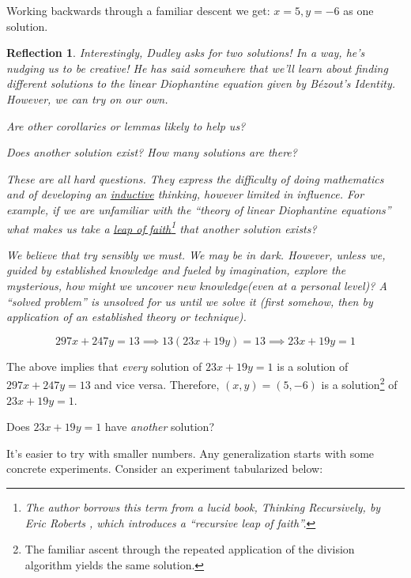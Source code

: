 \documentclass[english,notitlepage,smartquotes]{hgbreport}
\theoremstyle{definition}
\theoremstyle{remark}
\theoremstyle{plain}
\newtheorem{reflection}{Reflection}
\begin{document}
\begin{enumerate}[label=\textbf{\arabic*}.]
Working backwards through a familiar descent we get: $x=5,y=-6$ as one solution.
\begin{reflection}
Interestingly, Dudley asks for two solutions! In a way, he's nudging us to be creative! He has said somewhere that we'll learn about finding different solutions to the linear Diophantine equation given by B\'ezout's Identity. However, we can try on our own.

Are other corollaries or lemmas likely to help us?

Does another solution exist? How many solutions are there?

These are all hard questions. They express the difficulty of doing mathematics and of developing an \underline{inductive} thinking, however limited in influence. For example, if we are unfamiliar with the ``theory of linear Diophantine equations'' what makes us take a \underline{leap of faith}\footnote{The author borrows this term from a lucid book, \emph{Thinking Recursively}, by Eric Roberts \cite{Roberts1986}, which introduces a ``recursive leap of faith''.} that another solution exists?

We believe that try sensibly we must. We may be in dark. However, unless we, guided by established knowledge and fueled by imagination, explore the mysterious, how might we uncover new knowledge(even at a personal level)? A ``solved problem'' is unsolved for us until we solve it (first somehow, then by application of an established theory or technique).
\end{reflection}

$$
297x+247y=13\implies 13(23x+19y)=13\implies 23x+19y=1
$$

The above implies that \emph{every} solution of $23x+19y=1$ is a solution of $297x+247y=13$ and vice versa. Therefore, $(x,y)=(5,-6)$ is a solution\footnote{The familiar ascent through the repeated application of the division algorithm yields the same solution.} of $23x+19y=1$.

Does $23x+19y=1$ have \emph{another} solution?

It's easier to try with smaller numbers. Any generalization starts with some concrete experiments. Consider an experiment tabularized below:


\end{enumerate}
\end{document}
